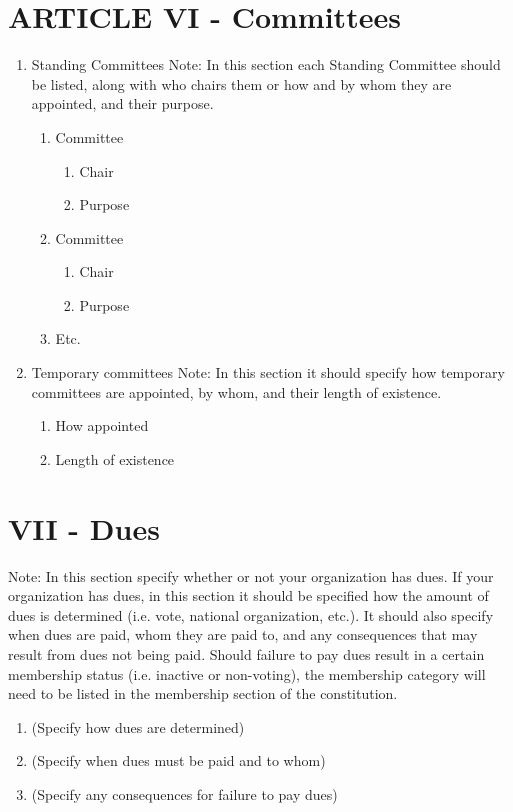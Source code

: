\documentclass[11pt,a4paper,notitlepage]{article}
\begin{document}
\section*{ARTICLE VI - Committees}
\begin{enumerate}[label=\Alph*.]
  \item Standing Committees Note:  In this section each Standing Committee
  should be listed, along with who chairs them or how and by whom they are
  appointed, and their purpose.
    \begin{enumerate}
      \item Committee
        \begin{enumerate}
          \item Chair
          \item Purpose
        \end{enumerate}
      \item Committee 
        \begin{enumerate}
          \item Chair
          \item Purpose
        \end{enumerate}
      \item Etc.
    \end{enumerate}
  \item Temporary committees Note:  In this section it should specify how
  temporary committees are appointed, by whom, and their length of existence.
    \begin{enumerate}
      \item How appointed
      \item Length of existence
    \end{enumerate}
\end{enumerate}


\section*{VII - Dues}
Note:  In this section specify whether or not your organization has dues.  If
your organization has dues, in this section it should be specified how the
amount of dues is determined (i.e. vote, national organization, etc.).  It
should also specify when dues are paid, whom they are paid to, and any
consequences that may result from dues not being paid.  Should failure to pay
dues result in a certain membership status (i.e. inactive or non-voting), the
membership category will need to be listed in the membership section of the
constitution.
\begin{enumerate}
  \item	(Specify how dues are determined)
  \item	(Specify when dues must be paid and to whom)
  \item	(Specify any consequences for failure to pay dues)
\end{enumerate}
\end{document}
